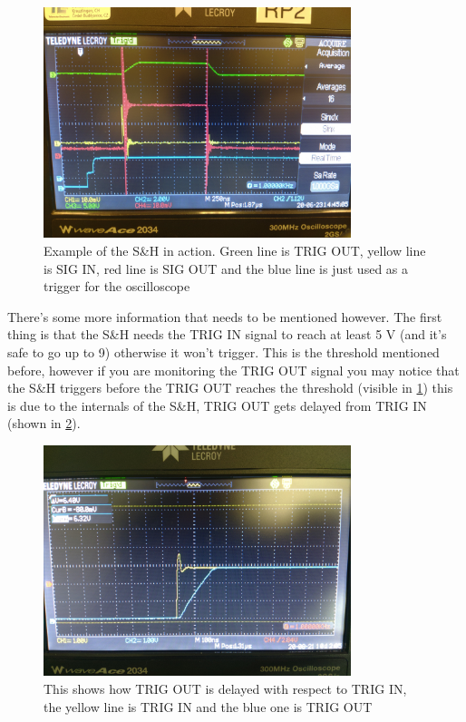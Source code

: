 \documentclass[a4paper, 10pt]{article}
\begin{document}
\begin{figure}[H]
    \centering
    \includegraphics[width=0.8\textwidth]{./images/sample-hold-osci.jpg}
    \caption{Example of the S\&H in action. Green line is TRIG OUT, yellow line is SIG IN, red line is SIG OUT and the blue line is just used as a trigger for the oscilloscope}
    \label{fig:sample-hold-osci}
\end{figure}

There's some more information that needs to be mentioned however.
The first thing is that the S\&H needs the TRIG IN signal to reach at least 5 \si{\volt} (and it's safe to go up to 9) otherwise it won't trigger.
This is the threshold mentioned before, however if you are monitoring the TRIG OUT signal you may notice that the S\&H triggers before the TRIG OUT reaches the threshold (visible in \cref{fig:sample-hold-osci}) this is due to the internals of the S\&H, TRIG OUT gets delayed from TRIG IN (shown in \cref{fig:sample-hold-trig-delay}).

\begin{figure}[H]
    \centering
    \includegraphics[width=0.8\textwidth]{./images/sample-hold-trig-delay.jpg}
    \caption{This shows how TRIG OUT is delayed with respect to TRIG IN, the yellow line is TRIG IN and the blue one is TRIG OUT}
    \label{fig:sample-hold-trig-delay}
\end{figure}
\end{document}
